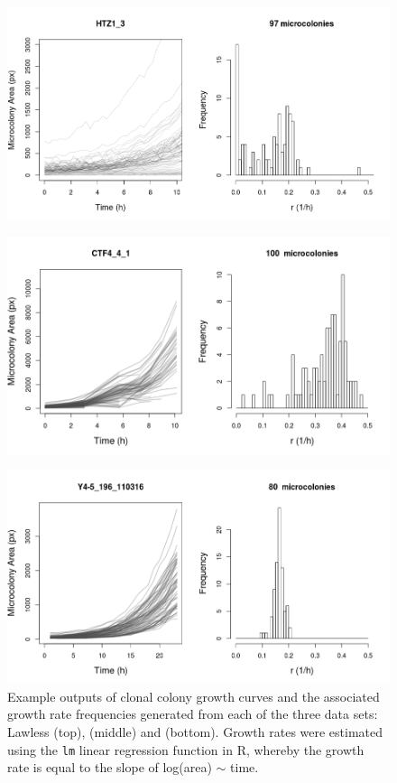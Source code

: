 \documentclass{bioinfo}
\begin{document}
\vspace{-1.5em}
\begin{figure}[H]
\includegraphics[width=1\linewidth]{LawlessExampleOutput4.png}
\end{figure}
\vspace{-4.3em}
\begin{figure}[H]
\includegraphics[width=1\linewidth]{LevyExampleOutput.png}
\end{figure}
\vspace{-4.3em}
\begin{figure}[H]
\includegraphics[width=1\linewidth]{ZivExampleOutput3.png}
\caption{Example outputs of clonal colony growth curves and the associated growth rate frequencies generated from each of the three data sets: Lawless (top), \citealp{Levy12} (middle) and \citealp{Ziv13} (bottom). Growth rates were estimated using the \texttt{lm} linear regression function in R, whereby the growth rate is equal to the slope of log(area) $\sim$ time.}
\label{fig:ExampleOutput}
\end{figure}
\end{document}
